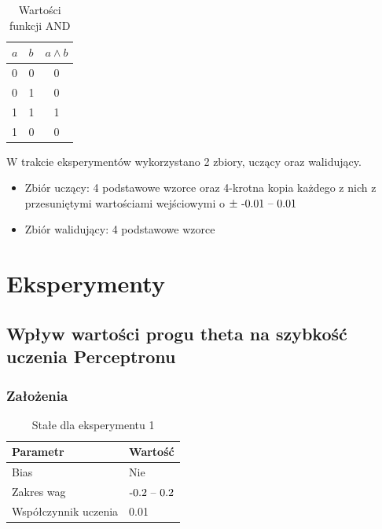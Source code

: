 \documentclass{article}
\begin{document}
\begin{table}[h]
	\caption{Wartości funkcji AND}
	\label{tabela-and}
	\centering
	\begin{tabular}{llc}
		\toprule
		\(a\) & \(b\) & \(a \land b\) \\
		\midrule
		0     & 0     & 0             \\
		0     & 1     & 0             \\
		1     & 1     & 1             \\
		1     & 0     & 0             \\
		\bottomrule
	\end{tabular}
\end{table}

W trakcie eksperymentów wykorzystano 2 zbiory, uczący oraz walidujący.
\begin{itemize}
	\item Zbiór uczący: 4 podstawowe wzorce oraz 4-krotna kopia każdego z nich z przesuniętymi wartościami wejściowymi o \(\pm\ $-0.01 -- 0.01$\)
	\item Zbiór walidujący: 4 podstawowe wzorce
\end{itemize}

\newpage
\section{Eksperymenty}

\subsection{Wpływ wartości progu theta na szybkość uczenia Perceptronu}
\subsubsection*{Założenia}
\begin{table}[h]
	\caption{Stałe dla eksperymentu 1}
	\label{tabela-const-1}
	\centering
	\begin{tabular}{ll}
		\toprule
		Parametr               & Wartość         \\
		\midrule
		Bias                   & Nie               \\
		Zakres wag             & \($-0.2 -- 0.2$\) \\
		Współczynnik uczenia & 0.01              \\
		\bottomrule
	\end{tabular}
\end{table}
\end{document}
